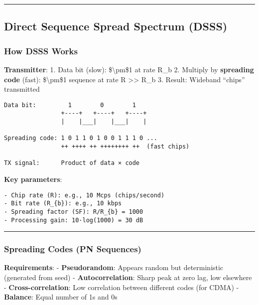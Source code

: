\begin{center}\rule{0.5\linewidth}{0.5pt}\end{center}

\subsection{\texorpdfstring{ Direct Sequence Spread Spectrum
(DSSS)}{ Direct Sequence Spread Spectrum (DSSS)}}\label{direct-sequence-spread-spectrum-dsss}

\subsubsection{How DSSS Works}\label{how-dsss-works}

\textbf{Transmitter}: 1. Data bit (slow): \$\textbackslash pm\$1 at rate
R_{b} 2. Multiply by \textbf{spreading code} (fast): \$\textbackslash pm\$1
sequence at rate R \textgreater\textgreater{} R_{b} 3. Result: Wideband
``chips'' transmitted

\begin{verbatim}
Data bit:         1        0        1
                +----+   +----+   +----+
                |    |___|    |___|    |
                
Spreading code: 1 0 1 1 0 1 0 0 1 1 1 0 ...
                ++ ++++ ++ ++++++++ ++  (fast chips)
                
TX signal:      Product of data × code
\end{verbatim}

\textbf{Key parameters}:

\begin{verbatim}
- Chip rate (R): e.g., 10 Mcps (chips/second)
- Bit rate (R_{b}): e.g., 10 kbps
- Spreading factor (SF): R/R_{b} = 1000
- Processing gain: 10·log(1000) = 30 dB
\end{verbatim}

\begin{center}\rule{0.5\linewidth}{0.5pt}\end{center}

\subsubsection{Spreading Codes (PN
Sequences)}\label{spreading-codes-pn-sequences}

\textbf{Requirements}: - \textbf{Pseudorandom}: Appears random but
deterministic (generated from seed) - \textbf{Autocorrelation}: Sharp
peak at zero lag, low elsewhere - \textbf{Cross-correlation}: Low
correlation between different codes (for CDMA) - \textbf{Balance}: Equal
number of 1s and 0s

